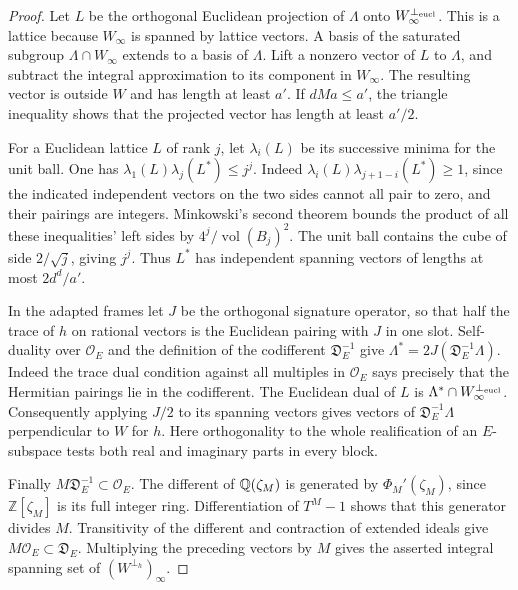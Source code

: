 \documentclass[a4paper,11pt]{article}
\theoremstyle{definition}
\theoremstyle{remark}
\newcommand{\ZZ}{\mathbb Z}\newcommand{\ord}{\operatorname{ord}}
\numberwithin{equation}{section}
\begin{document}
\begin{proof}
Let \(L\) be the orthogonal Euclidean projection of \(\Lambda\) onto
\(W_\infty^{\perp_{\rm eucl}}\). This is a lattice because \(W_\infty\)
is spanned by lattice vectors. A basis of the saturated subgroup
\(\Lambda\cap W_\infty\) extends to a basis of \(\Lambda\).
Lift a nonzero vector of \(L\) to \(\Lambda\), and subtract the
integral approximation to its component in \(W_\infty\).
The resulting vector is outside \(W\) and has length at least \(a'\).
If \(dMa\le a'\), the triangle inequality shows that the projected
vector has length at least \(a'/2\).

For a Euclidean lattice \(L\) of rank \(j\), let
\(\lambda_i(L)\) be its successive minima for the unit ball.
One has \(\lambda_1(L)\lambda_j(L^*)\le j^j\). Indeed
\(\lambda_i(L)\lambda_{j+1-i}(L^*)\ge1\), since the indicated independent
vectors on the two sides cannot all pair to zero, and their pairings
are integers. Minkowski's second theorem bounds the product of
all these inequalities' left sides by \(4^j/\operatorname{vol}(B_j)^2\).
The unit ball contains the cube of side \(2/\sqrt j\), giving \(j^j\).
Thus \(L^*\) has independent spanning vectors of lengths at most
\(2d^d/a'\).

In the adapted frames let \(J\) be the orthogonal signature operator,
so that half the trace of \(h\) on rational vectors is the Euclidean
pairing with \(J\) in one slot. Self-duality over \(\mathcal O_E\)
and the definition of the codifferent \(\mathfrak D_E^{-1}\) give
\(\Lambda^*=2J(\mathfrak D_E^{-1}\Lambda)\). Indeed the trace dual
condition against all multiples in \(\mathcal O_E\) says precisely
that the Hermitian pairings lie in the codifferent. The Euclidean
dual of \(L\) is \(\Lambda^*\cap W_\infty^{\perp_{\rm eucl}}\).
Consequently applying \(J/2\) to its spanning vectors gives
vectors of \(\mathfrak D_E^{-1}\Lambda\) perpendicular to \(W\)
for \(h\). Here orthogonality to the whole realification of an
\(E\)-subspace tests both real and imaginary parts in every block.

Finally \(M\mathfrak D_E^{-1}\subset\mathcal O_E\).
The different of \(\mathbb Q(\zeta_M)\) is generated by
\(\Phi_M'(\zeta_M)\), since \(\ZZ[\zeta_M]\) is its full integer
ring. Differentiation of \(T^M-1\) shows that this generator divides
\(M\). Transitivity of the different and contraction of extended
ideals give \(M\mathcal O_E\subset\mathfrak D_E\).
Multiplying the preceding vectors by \(M\) gives the asserted
integral spanning set of \((W^{\perp_h})_\infty\).
\end{proof}
\end{document}
